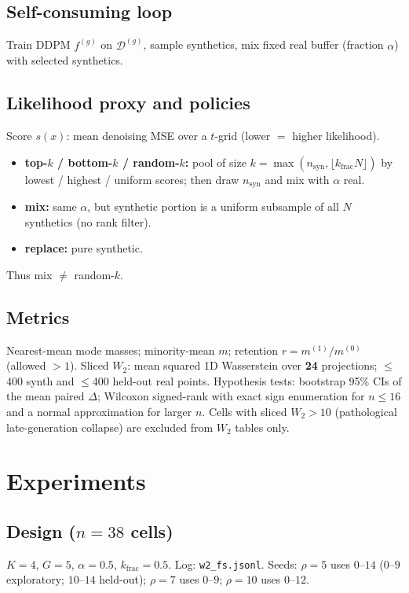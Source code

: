 \documentclass[11pt]{article}
\begin{document}
\subsection{Self-consuming loop}
Train DDPM $f^{(g)}$ on $\mathcal{D}^{(g)}$, sample synthetics, mix fixed real buffer (fraction $\alpha$) with selected synthetics.

\subsection{Likelihood proxy and policies}
Score $s(x)$: mean denoising MSE over a $t$-grid (lower $=$ higher likelihood).
\begin{itemize}
\item \textbf{top-$k$ / bottom-$k$ / random-$k$:} pool of size $k=\max(n_{\mathrm{syn}},\lfloor k_{\mathrm{frac}}N\rfloor)$ by lowest / highest / uniform scores; then draw $n_{\mathrm{syn}}$ and mix with $\alpha$ real.
\item \textbf{mix:} same $\alpha$, but synthetic portion is a uniform subsample of all $N$ synthetics (no rank filter).
\item \textbf{replace:} pure synthetic.
\end{itemize}
Thus mix $\neq$ random-$k$.

\subsection{Metrics}
\label{sec:metrics}
Nearest-mean mode masses; minority-mean $m$; retention $r=m^{(1)}/m^{(0)}$ (allowed $>1$).
Sliced $W_2$: mean squared 1D Wasserstein over \textbf{24} projections; $\le$400 synth and $\le$400 held-out real points.
Hypothesis tests: bootstrap 95\% CIs of the mean paired $\Delta$; Wilcoxon signed-rank with exact sign enumeration for $n{\le}16$ and a normal approximation for larger $n$.
Cells with sliced $W_2{>}10$ (pathological late-generation collapse) are excluded from $W_2$ tables only.

\section{Experiments}
\subsection{Design ($n{=}38$ cells)}
$K{=}4$, $G{=}5$, $\alpha{=}0.5$, $k_{\mathrm{frac}}{=}0.5$. Log: \texttt{w2\_fs.jsonl}.
Seeds: $\rho{=}5$ uses $0$--$14$ ($0$--$9$ exploratory; $10$--$14$ held-out); $\rho{=}7$ uses $0$--$9$; $\rho{=}10$ uses $0$--$12$.
\end{document}
